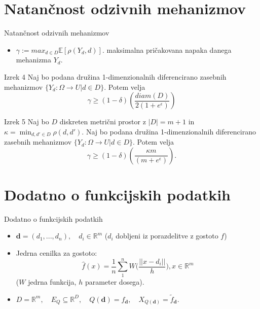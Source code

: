 \documentclass{beamer}
\begin{document}
\section{Natančnost odzivnih mehanizmov}
\begin{frame}{Natančnost odzivnih mehanizmov}
\begin{itemize}
\item $\gamma := max_{d\in D}\mathbb{E}[\rho(Y_d,d)].$ maksimalna pričakovana napaka danega mehanizma $Y_d$.
\end{itemize}
\begin{block}{Izrek 4}
Naj bo podana družina 1-dimenzionalnih diferencirano zasebnih mehanizmov $\{ Y_d: \Omega \rightarrow U | d \in D\}$. Potem velja $$\gamma  \geq (1-\delta)(\frac{diam(D)}{2(1+e^\epsilon)})$$
\end{block}
\begin{block}{Izrek 5}
Naj bo $D$ diskreten metrični prostor z $|D| = m + 1$ in $\kappa = \min_{d, d' \in D} \rho(d,d')$. Naj bo podana družina 1-dimenzionalnih diferencirano zasebnih mehanizmov $\{ Y_d: \Omega \rightarrow U | d \in D\}$. Potem velja $$\gamma  \geq (1-\delta)(\frac{\kappa m}{(m+e^\epsilon)}).$$
\end{block}
\end{frame}

\section{Dodatno o funkcijskih podatkih}

\begin{frame}{Dodatno o funkcijskih podatkih}
\begin{itemize}
\item $\textbf{d} = (d_1,...,d_n), \quad d_i \in \mathbb{R}^m$ ($d_i$ dobljeni iz porazdelitve z gostoto $f$)
\item Jedrna cenilka za gostoto:
$$
\hat{f}(x)=\frac{1}{n}\sum_{1}^{n}W\Big(\frac{||x-d_i||}{h}\Big), x \in \mathbb{R}^m
$$
($W$ jedrna funkcija, $h$ parameter dosega).
\item $D = \mathbb{R}^m, \quad E_Q \subseteq \mathbb{R}^D, \quad Q(\textbf{d}) = f_{\textbf{d}}, \quad X_{Q({\textbf{d}})} = \tilde{f}_{\textbf{d}}.$
\end{itemize}
\end{frame}
\end{document}
